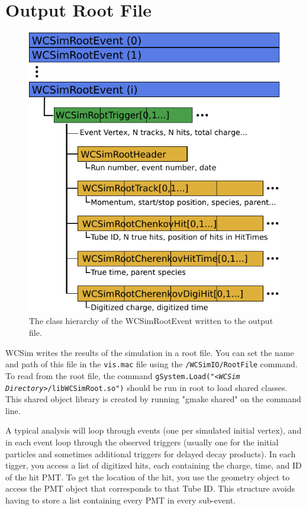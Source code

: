 \section{Output Root File}

\begin{figure}[t!]
  \begin{center}
\includegraphics{rootfile}
  \end{center}
\caption{The class hierarchy of the WCSimRootEvent written to the output file.} \label{fig:rootfile}
\end{figure}

WCSim writes the results of the simulation in a root file. You can set the name and path of this file in the \texttt{vis.mac} file using the \texttt{/WCSimIO/RootFile} command.  To read from the root file, the command \texttt{gSystem.Load("<\emph{WCSim Directory}>/libWCSimRoot.so")} should be run in root to load shared classes.  This shared object library is created by running "gmake shared" on the command line.

A typical analysis will loop through events (one per simulated initial vertex), and in each event loop through the observed triggers (usually one for the initial particles and sometimes additional triggers for delayed decay products).  In each tigger, you access a list of digitized hits, each containing the charge, time, and ID of the hit PMT.  To get the location of the hit, you use the geometry object to access the PMT object that corresponds to that Tube ID.  This structure avoids having to store a list containing every PMT in every sub-event.

